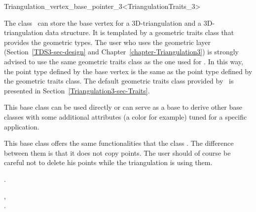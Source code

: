 

\begin{ccRefClass}{Triangulation_vertex_base_pointer_3<TriangulationTraits_3>}  %


\ccDefinition
  
The class \ccRefName\ can store the base vertex for a 3D-triangulation 
and a 3D-triangulation data structure. It is templated by a
geometric traits class  that provides the geometric
types. The user who uses the geometric layer
(Section~\ref{TDS3-sec-design} and
Chapter~\ref{chapter-Triangulation3}) is strongly advised to use the
same geometric traits class  as the one used for
. 
In this way, the point type
defined by the base vertex is the same as the point type defined by
the geometric traits class. The default geometric traits class
provided by \cgal\ is presented in
Section~\ref{Triangulation3-sec-Traits}. 

This base class can be used directly or can serve as a base to derive
other base classes with some additional attributes (a color for
example) tuned for a specific application.

This base class offers the same functionalities that the class
. The difference between them is that 
it does not copy points. The user should of course be careful not to
delete his points while the triangulation is using them. 


\ccIsModel

.

\ccSeeAlso

,\\
.



\end{ccRefClass}


